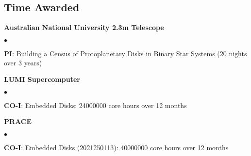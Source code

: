 \documentclass[margin,line]{res}
\newenvironment{list1}{
	\begin{list}{\ding{113}}{%
			\setlength{\itemsep}{0in}
			\setlength{\parsep}{0in} \setlength{\parskip}{0in}
			\setlength{\topsep}{0in} \setlength{\partopsep}{0in} 
			\setlength{\leftmargin}{0.17in}}}{\end{list}}
\newenvironment{list2}{
	\begin{list}{$\bullet$}{%
			\setlength{\itemsep}{0in}
			\setlength{\parsep}{0in} \setlength{\parskip}{0in}
			\setlength{\topsep}{0in} \setlength{\partopsep}{0in} 
			\setlength{\leftmargin}{0.2in}}}{\end{list}}
\begin{document}
\begin{resume}
		\section{\sc Time Awarded}
		\begin{list1}
			\item[] {\bf Australian National University 2.3m Telescope}
			\begin{list2}
				\item {\bf PI}: Building a Census of Protoplanetary Disks in Binary Star Systems (20 nights over 3 years)
			\end{list2}
                \item[]{\bf LUMI Supercomputer}
                \begin{list2}
				\item {\bf CO-I}: Embedded Disks: 24000000 core hours over 12 months
                \end{list2}
                \item[]{\bf PRACE}
                \begin{list2}
				\item {\bf CO-I}: Embedded Disks (2021250113): 40000000 core hours over 12 months
                \end{list2}
		\end{list1}
  
		\vspace{-0.3cm}
  

\end{resume}
\end{document}
